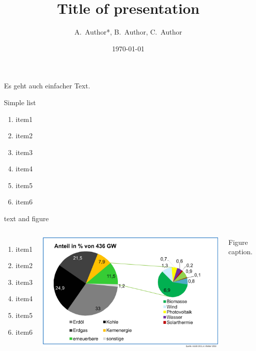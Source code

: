 \documentclass[final]{beamer} %
\title{Title of presentation }
\author[Author]{A.~Author\inst{1}*, B.~Author\inst{2}, C.~Author\inst{3}}
\institute[]{%
     \inst{1}Max Planck Institute for Plasma Physics, Wendelsteinstr. 1, D-17491 Greifswald, Germany, 
     \inst{2}Institute 2, street2, town2, country2, 
	 \inst{3}Institute 3, street3, town3, country3 
     }
\date{\today}
\begin{document}
  \begin{frame}
  \frametitle{}
Es geht auch einfacher Text.
    \begin{kasten}{\large Simple list}
      \begin{enumerate}
        \item item1
        \item item2
        \item item3
        \item item4
        \item item5
        \item item6
      \end{enumerate}
    \end{kasten}
    \begin{kasten}{\large text and figure}
    \begin{columns}
      \begin{enumerate}
        \item item1
        \item item2
        \item item3
        \item item4
        \item item5
        \item item6
      \end{enumerate}\hfill
    \includegraphics[width=.7\textwidth]{primaerenergieverbrauch_dt_2013}\par
    Figure caption.
    \end{columns}
    \end{kasten}
		

\end{frame}
\end{document}
